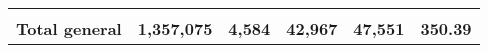 \begin{tabular}{lrcclr}
	& \multicolumn{1}{l}{}                                           & \multicolumn{1}{l}{}                                       & \multicolumn{1}{l}{} &                                                                     & \multicolumn{1}{l}{}                                                         \\
	\rowcolor[HTML]{DDEBF7} 
	\textbf{Total   general}                                       & \textbf{1,357,075}                                             & \multicolumn{1}{r}{\cellcolor[HTML]{DDEBF7}\textbf{4,584}} & \textbf{42,967}      & \textbf{47,551}                                                     & \textbf{350.39}                                                             
\end{tabular}
